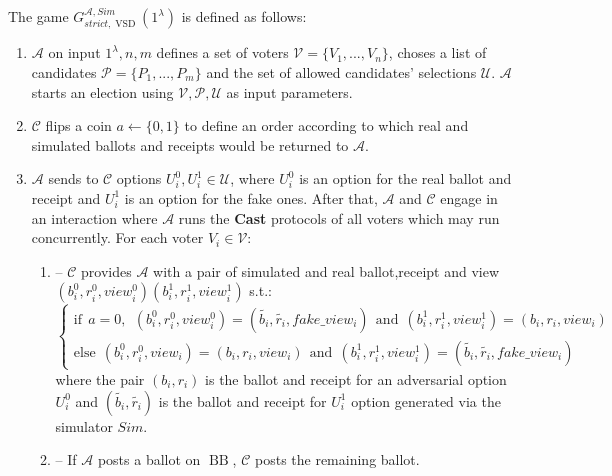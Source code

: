 \documentclass[12pt]{article}
\DeclareMathOperator{\vsd}{VSD}
\DeclareMathOperator{\bb}{BB}
\begin{document}
The game $G_{strict, \vsd}^{\mathcal{A},Sim}(1^{\lambda})$ is defined as follows:
\begin{enumerate} 
\item $\mathcal{A}$ on input $1^{\lambda},n,m$ defines a set of voters  $\mathcal{V} = \{V_1,...,V_n\}$, choses a list of candidates  $\mathcal{P} = \{P_1,...,P_m\}$ and the set of allowed candidates' selections $\mathcal{U}$.  $\mathcal{A}$ starts an election using $\mathcal{V}, \mathcal{P}, \mathcal{U}$ as input parameters.
\item $\mathcal{C}$ flips a coin $a \leftarrow \{0,1\}$ to define an order according to which real and simulated ballots and receipts would be returned to $\mathcal{A}$.
\item   $\mathcal{A}$ sends to  $\mathcal{C}$ options $U_i^0, U_i^1 \in  \mathcal{U}$, where $U_i^0$ is an option for the real ballot and receipt and $U_i^1$ is an option for the fake ones.  After that, $\mathcal{A}$ and $\mathcal{C}$ engage in an interaction where $\mathcal{A}$ runs the \textbf{Cast} protocols of all voters which may run concurrently. For each voter $V_i \in \mathcal{V}$: 
\begin{enumerate}
\item[] -- $\mathcal{C}$  provides $\mathcal{A}$ with a pair of simulated and real ballot,receipt and view $(b_i^0, r_i^0,view_i^0) (b_i^1, r_i^1,view_i^1)$ s.t.:\\
$ \begin{cases}
 \text{if} ~~a =0,~~ (b_i^0,r_i^0,view_i^0) = (\tilde{b_i},\tilde{r_i},fake\_view_i) ~~ \text{and} ~~  (b_i^1,r_i^1,view_i^1) = (b_i,r_i,view_i)   \\ 
 \text{else}~~ (b_i^0,r_i^0,view_i) =(b_i,r_i,view_i)~~  \text{and} ~~  (b_i^1,r_i^1,view_i^1) =(\tilde{b_i},\tilde{r_i},fake\_view_i)
\end{cases}$\\ 
where the pair $(b_i, r_i)$ is the ballot and receipt for an adversarial option $U_i^0$ and $(\tilde{b_i},\tilde{r_i})$ is the ballot and receipt for  $U_i^1$ option generated via the simulator $Sim$.
\item[] --  If  $\mathcal{A}$ posts a ballot on $\bb$, $\mathcal{C}$ posts the remaining ballot. 
\end{enumerate}

\end{enumerate}
\end{document}
